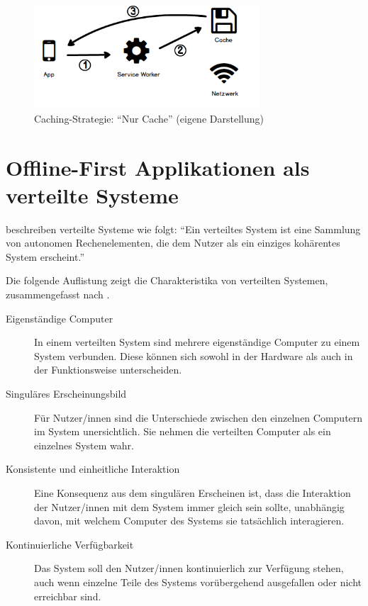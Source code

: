 \documentclass[a4paper, 12pt]{scrreprt}
\begin{document}
\begin{figure}[H]
	\centering
	\includegraphics[width=0.75\textwidth]{cacheonly.png}
	\caption[Caching-Strategie: \enquote{Nur Cache}]{Caching-Strategie: \enquote{Nur Cache} (eigene Darstellung)}
	\label{fig:cachingCacheOnly}
\end{figure}

\section{Offline-First Applikationen als verteilte Systeme}\label{sec:OfflineFirstVerteiteSysteme}
\citet{ArticleDistributedSystems} beschreiben verteilte Systeme wie folgt: \enquote{Ein verteiltes System ist eine Sammlung von autonomen Rechenelementen, die dem Nutzer als ein einziges kohärentes System erscheint.}

Die folgende Auflistung zeigt die Charakteristika von verteilten Systemen, zusammengefasst nach \citet[S. 2-3]{BookDistributedSystemsDefinition}.

\begin{description}
\item[Eigenständige Computer] In einem verteilten System sind mehrere eigenständige Computer zu einem System verbunden. Diese können sich sowohl in der Hardware als auch in der Funktionsweise unterscheiden. 
\item[Singuläres Erscheinungsbild] Für Nutzer/innen sind die Unterschiede zwischen den einzelnen Computern im System unersichtlich. Sie nehmen die verteilten Computer als ein einzelnes System wahr. 
\item[Konsistente und einheitliche Interaktion]
	Eine Konsequenz aus dem singulären Erscheinen ist, dass die Interaktion der Nutzer/innen mit dem System immer gleich sein sollte, unabhängig davon, mit welchem Computer des Systems sie tatsächlich interagieren. 
\item[Kontinuierliche Verfügbarkeit]
	Das System soll den Nutzer/innen kontinuierlich zur Verfügung stehen, auch wenn einzelne Teile des Systems vorübergehend ausgefallen oder nicht erreichbar sind.
\end{description}
\label{tab:charakteristikaDistributedSystem}
\end{document}
